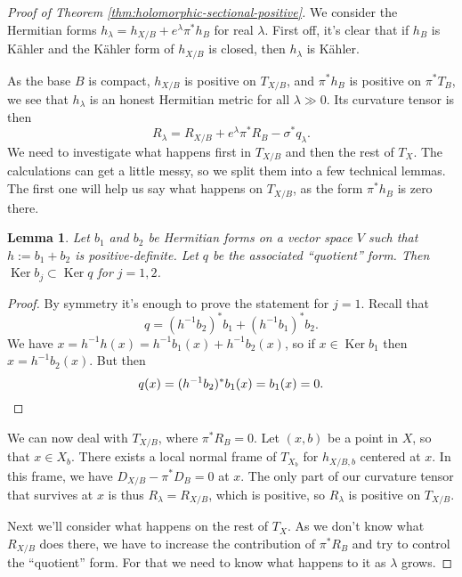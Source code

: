 \documentclass[10pt,a4paper]{amsart}
\newtheorem{lemm}[theo]{Lemma}
\theoremstyle{definition}
\DeclareMathOperator{\Ker}{Ker}
\begin{document}
\begin{proof}[Proof of Theorem \ref{thm:holomorphic-sectional-positive}]
We consider the Hermitian forms $h_{\lambda} = h_{X/B} + e^{\lambda} \pi^{*} h_{B}$ for real $\lambda$.
First off, it's clear that if $h_{B}$ is K\"ahler and the K\"ahler form of $h_{X/B}$ is closed, then $h_{\lambda}$ is K\"ahler.

As the base $B$ is compact, $h_{X/B}$ is positive on $T_{X/B}$, and $\pi^{*}h_{B}$ is positive on $\pi^{*}T_{B}$, we see that $h_{\lambda}$ is an honest Hermitian metric for all $\lambda \gg 0$.
Its curvature tensor is then
\[
  R_{\lambda}
  = R_{X/B} + e^{\lambda}\pi^{*}R_{B} - \sigma^{*}q_{\lambda}.
\]
We need to investigate what happens first in $T_{X/B}$ and then the rest of $T_{X}$.
The calculations can get a little messy, so we split them into a few technical lemmas.
The first one will help us say what happens on $T_{X/B}$, as the form $\pi^{*}h_{B}$ is zero there.


\begin{lemm}
Let $b_{1}$ and $b_{2}$ be Hermitian forms on a vector space $V$ such that $h := b_{1} + b_{2}$ is positive-definite.
Let $q$ be the associated ``quotient'' form.
Then $\Ker b_{j} \subset \Ker q$ for $j = 1,2$.
\end{lemm}

\begin{proof}
By symmetry it's enough to prove the statement for $j = 1$.
Recall that
\[
  q = (h^{-1}b_{2})^{*}b_{1} + (h^{-1}b_{1})^{*}b_{2}.
\]
We have $x = h^{-1}h(x) = h^{-1}b_{1}(x) + h^{-1}b_{2}(x)$, so if $x \in \Ker b_{1}$ then $x = h^{-1}b_{2}(x)$.
But then
\begin{equation*}
q(x) = (h^{-1}b_{2})^{*}b_{1}(x) = b_{1}(x) = 0.
\qedhere
\end{equation*}
\end{proof}

We can now deal with $T_{X/B}$, where $\pi^*R_B = 0$.
Let $(x,b)$ be a point in $X$, so that $x \in X_b$.
There exists a local normal frame of $T_{X_b}$ for $h_{X/B,b}$ centered at $x$.
In this frame, we have $D_{X/B} - \pi^* D_B = 0$ at $x$.
The only part of our curvature tensor that survives at $x$ is thus
$R_\lambda = R_{X/B}$,
which is positive, so $R_\lambda$ is positive on $T_{X/B}$.

Next we'll consider what happens on the rest of $T_{X}$.
As we don't know what $R_{X/B}$ does there, we have to increase the contribution of $\pi^{*}R_{B}$ and try to control the ``quotient'' form.
For that we need to know what happens to it as $\lambda$ grows.




\end{proof}
\end{document}
